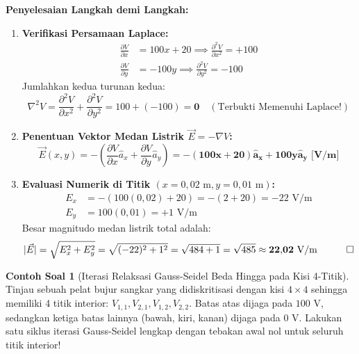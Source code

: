 \documentclass[11pt,a4paper]{article}
\theoremstyle{definition}
\newtheorem{example}{Contoh Soal}[section]
\begin{document}
\noindent\textbf{Penyelesaian Langkah demi Langkah:}
\begin{enumerate}[leftmargin=*]
    \item \textbf{Verifikasi Persamaan Laplace:}
    \begin{align*}
        \frac{\partial V}{\partial x} &= 100x + 20 \implies \frac{\partial^2 V}{\partial x^2} = +100 \\
        \frac{\partial V}{\partial y} &= -100y \implies \frac{\partial^2 V}{\partial y^2} = -100
    \end{align*}
    Jumlahkan kedua turunan kedua:
    \begin{equation*}
        \nabla^2 V = \frac{\partial^2 V}{\partial x^2} + \frac{\partial^2 V}{\partial y^2} = 100 + (-100) = \mathbf{0} \quad (\text{Terbukti Memenuhi Laplace!})
    \end{equation*}
    
    \item \textbf{Penentuan Vektor Medan Listrik $\vec{E} = -\nabla V$:}
    \begin{equation*}
        \vec{E}(x, y) = -\left( \frac{\partial V}{\partial x}\hat{a}_x + \frac{\partial V}{\partial y}\hat{a}_y \right) = \mathbf{-(100x + 20)\hat{a}_x + 100y\hat{a}_y\text{ [V/m]}}
    \end{equation*}
    
    \item \textbf{Evaluasi Numerik di Titik $(x = 0{,}02\text{ m}, y = 0{,}01\text{ m})$:}
    \begin{align*}
        E_x &= -(100(0{,}02) + 20) = -(2 + 20) = -22\text{ V/m} \\
        E_y &= 100(0{,}01) = +1\text{ V/m}
    \end{align*}
    Besar magnitudo medan listrik total adalah:
    \begin{equation*}
        |\vec{E}| = \sqrt{E_x^2 + E_y^2} = \sqrt{(-22)^2 + 1^2} = \sqrt{484 + 1} = \sqrt{485} \approx \mathbf{22{,}02\text{ V/m}} \quad \qed
    \end{equation*}
\end{enumerate}

\begin{example}[Iterasi Relaksasi Gauss-Seidel Beda Hingga pada Kisi 4-Titik]
Tinjau sebuah pelat bujur sangkar yang didiskritisasi dengan kisi $4 \times 4$ sehingga memiliki 4 titik interior: $V_{1,1}, V_{2,1}, V_{1,2}, V_{2,2}$. Batas atas dijaga pada $100\text{ V}$, sedangkan ketiga batas lainnya (bawah, kiri, kanan) dijaga pada $0\text{ V}$.
Lakukan satu siklus iterasi Gauss-Seidel lengkap dengan tebakan awal nol untuk seluruh titik interior!
\end{example}
\end{document}
